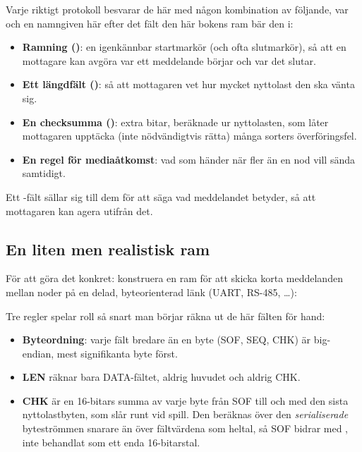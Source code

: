 Varje riktigt protokoll besvarar de här med någon kombination av följande, var och en namngiven här
efter det fält den här bokens ram bär den i:
\begin{itemize}
  \item \textbf{Ramning ()}: en igenkännbar startmarkör (och ofta slutmarkör), så att en
    mottagare kan avgöra var ett meddelande börjar och var det slutar.
  \item \textbf{Ett längdfält ()}: så att mottagaren vet hur mycket nyttolast den ska
    vänta sig.
  \item \textbf{En checksumma ()}: extra bitar, beräknade ur nyttolasten, som låter
    mottagaren upptäcka (inte nödvändigtvis rätta) många sorters överföringsfel.
  \item \textbf{En regel för mediaåtkomst}: vad som händer när fler än en nod vill sända samtidigt.
\end{itemize}

Ett -fält sällar sig till dem för att säga vad meddelandet betyder, så att mottagaren kan
agera utifrån det.

\subsection*{En liten men realistisk ram}
För att göra det konkret: konstruera en ram för att skicka korta meddelanden mellan noder på en
delad, byteorienterad länk (UART, RS-485, \dots):


Tre regler spelar roll så snart man börjar räkna ut de här fälten för hand:
\begin{itemize}
  \item \textbf{Byteordning}: varje fält bredare än en byte (SOF, SEQ, CHK) är big-endian, mest
    signifikanta byte först.
  \item \textbf{LEN} räknar bara DATA-fältet, aldrig huvudet och aldrig CHK.
  \item \textbf{CHK} är en 16-bitars summa av varje byte från SOF till och med den sista
    nyttolastbyten, som slår runt vid spill. Den beräknas över den \emph{serialiserade}
    byteströmmen snarare än över fältvärdena som heltal, så SOF bidrar med
    , inte  behandlat som ett enda 16-bitarstal.
\end{itemize}

